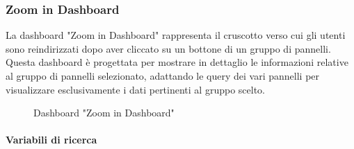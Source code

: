 \subsubsection{Zoom in Dashboard}
La dashboard "Zoom in Dashboard" rappresenta il cruscotto verso cui gli utenti sono reindirizzati dopo aver cliccato su un bottone di un gruppo di pannelli. Questa dashboard è progettata per mostrare in dettaglio le informazioni relative al gruppo di pannelli selezionato, adattando le query dei vari pannelli per visualizzare esclusivamente i dati pertinenti al gruppo scelto.
\begin{figure}[H]
    \centering
    \caption{Dashboard "Zoom in Dashboard"}
    \label{fig:my_label}
\end{figure}

\paragraph{Variabili di ricerca}
\hypertarget{par:variabili_panel}{}

